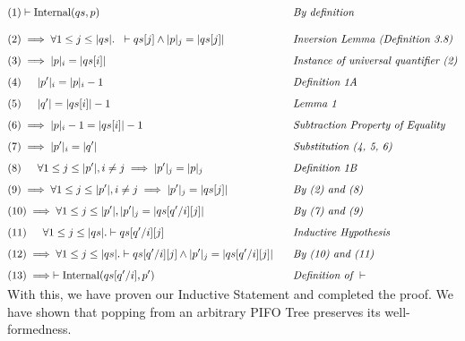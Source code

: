 \documentclass{article}
\begin{document}
\begin{alignat*}{5}
&(1) \vdash \text{Internal}(qs, p) && \hspace{0.3cm} \textit{By definition}\\[10pt]
&(2) \implies \forall 1 \leq j \leq |qs|. \hspace{0.2cm} \vdash qs[j] \land |p|_j = |qs[j]|&& \hspace{0.3cm} \textit{Inversion Lemma (Definition 3.8)}\\[5pt]
&(3) \implies |p|_i = |qs[i]|&& \hspace{0.3cm} \textit{Instance of universal quantifier (2)}\\[5pt]
&(4) \indent |p'|_i = |p|_i - 1&& \hspace{0.3cm} \textit{Definition 1A}\\[5pt]
&(5) \indent |q'| = |qs[i]| - 1&& \hspace{0.3cm} \textit{Lemma 1}\\[5pt]
&(6) \implies |p|_i - 1 = |qs[i]| - 1&& \hspace{0.3cm} \textit{Subtraction Property of Equality}\\[5pt]
&(7) \implies |p'|_i = |q'|&& \hspace{0.3cm} \textit{Substitution (4, 5, 6)}\\[5pt]
&(8) \indent \forall 1 \leq j \leq |p'|, i \neq j \implies |p'|_j = |p|_j&& \hspace{0.3cm} \textit{Definition 1B}\\[5pt]
&(9) \implies \forall 1 \leq j \leq |p'|, i \neq j \implies |p'|_j = |qs[j]|&& \hspace{0.3cm} \textit{By (2) and (8)}\\[5pt]
&(10) \implies \forall 1 \leq j \leq |p'|, |p'|_j = |qs[q' / i][j]|&& \hspace{0.3cm} \textit{By (7) and (9)}\\[5pt]
&(11)  \indent \forall 1 \leq j \leq |qs|. \vdash qs[q'/i][j]&& \hspace{0.3cm} \textit{Inductive Hypothesis}\\[5pt]
&(12) \implies \forall 1 \leq j \leq |qs|. \vdash qs[q'/i][j] \land |p'|_j = |qs[q'/i][j]|&&\hspace{0.3cm} \textit{By (10) and (11)}\\[5pt]
&(13) \implies \vdash \text{Internal}(qs[q'/i], p') && \hspace{0.3cm} \textit{Definition of } \vdash\\[-10pt]
\end{alignat*}

With this, we have proven our Inductive Statement and completed the proof. We have shown that popping from an arbitrary PIFO Tree preserves its well-formedness.\\[-10pt]
\end{document}
